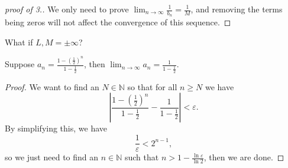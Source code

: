 \begin{proof}[proof of 3.]
We only need to prove \(\lim_{n \to \infty} \frac{1}{b_n} = \frac{1}{M}\), and removing the terms being zeros will not affect the convergence of this sequence.
\end{proof}

\begin{note}
	What if \(L,M= \pm \infty\)? 
\end{note}

\begin{exercise}
	Suppose \(a_n = \frac{1 - \left( \frac{1}{2} \right)^n }{1 - \frac{1}{2}}\), then \(\lim_{n \to \infty} a_n = \frac{1}{1 - \frac{1}{2}} \).
\end{exercise}
\begin{proof}
	We want to find an \(N \in \mathbb{N} \) so that for all \(n \ge N\) we have
	\[
		\left\vert \frac{1 - \left( \frac{1}{2} \right)^n }{1 - \frac{1}{2}} - \frac{1}{1 - \frac{1}{2}} \right\vert < \varepsilon. 
	\]  
	By simplifying this, we have 
	\[
		\frac{1}{\varepsilon } < 2^{n-1},
	\]
	so we just need to find an \(n \in \mathbb{N} \) such that \(n > 1 - \frac{\ln  \varepsilon }{\ln 2}\), then we are done.  
\end{proof}





